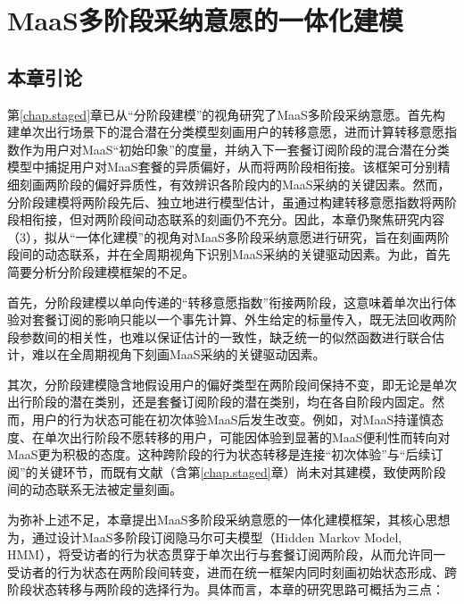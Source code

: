  \setlength{\baselineskip}{20pt}
\chapter{MaaS多阶段采纳意愿的一体化建模}\label{chap.integrated}

\section{本章引论}\label{sec.int.intro}

第\ref{chap.staged}章已从``分阶段建模''的视角研究了MaaS多阶段采纳意愿。首先构建单次出行场景下的混合潜在分类模型刻画用户的转移意愿，进而计算转移意愿指数作为用户对MaaS``初始印象''的度量，并纳入下一套餐订阅阶段的混合潜在分类模型中捕捉用户对MaaS套餐的异质偏好，从而将两阶段相衔接。该框架可分别精细刻画两阶段的偏好异质性，有效辨识各阶段内的MaaS采纳的关键因素。然而，分阶段建模将两阶段先后、独立地进行模型估计，虽通过构建转移意愿指数将两阶段相衔接，但对两阶段间动态联系的刻画仍不充分。因此，本章仍聚焦研究内容（3），拟从``一体化建模''的视角对MaaS多阶段采纳意愿进行研究，旨在刻画两阶段间的动态联系，并在全周期视角下识别MaaS采纳的关键驱动因素。为此，首先简要分析分阶段建模框架的不足。

首先，分阶段建模以单向传递的``转移意愿指数''衔接两阶段，这意味着单次出行体验对套餐订阅的影响只能以一个事先计算、外生给定的标量传入，既无法回收两阶段参数间的相关性，也难以保证估计的一致性\citep{walkerGeneralizedRandomUtility2002}，缺乏统一的似然函数进行联合估计，难以在全周期视角下刻画MaaS采纳的关键驱动因素。

其次，分阶段建模隐含地假设用户的偏好类型在两阶段间保持不变，即无论是单次出行阶段的潜在类别，还是套餐订阅阶段的潜在类别，均在各自阶段内固定。然而，用户的行为状态可能在初次体验MaaS后发生改变。例如，对MaaS持谨慎态度、在单次出行阶段不愿转移的用户，可能因体验到显著的MaaS便利性而转向对MaaS更为积极的态度。这种跨阶段的行为状态转移是连接``初次体验''与``后续订阅''的关键环节，而既有文献（含第\ref{chap.staged}章）尚未对其建模，致使两阶段间的动态联系无法被定量刻画。

为弥补上述不足，本章提出MaaS多阶段采纳意愿的一体化建模框架，其核心思想为，通过设计MaaS多阶段订阅隐马尔可夫模型（Hidden Markov Model, HMM），将受访者的行为状态贯穿于单次出行与套餐订阅两阶段，从而允许同一受访者的行为状态在两阶段间转变，进而在统一框架内同时刻画初始状态形成、跨阶段状态转移与两阶段的选择行为。具体而言，本章的研究思路可概括为三点：

